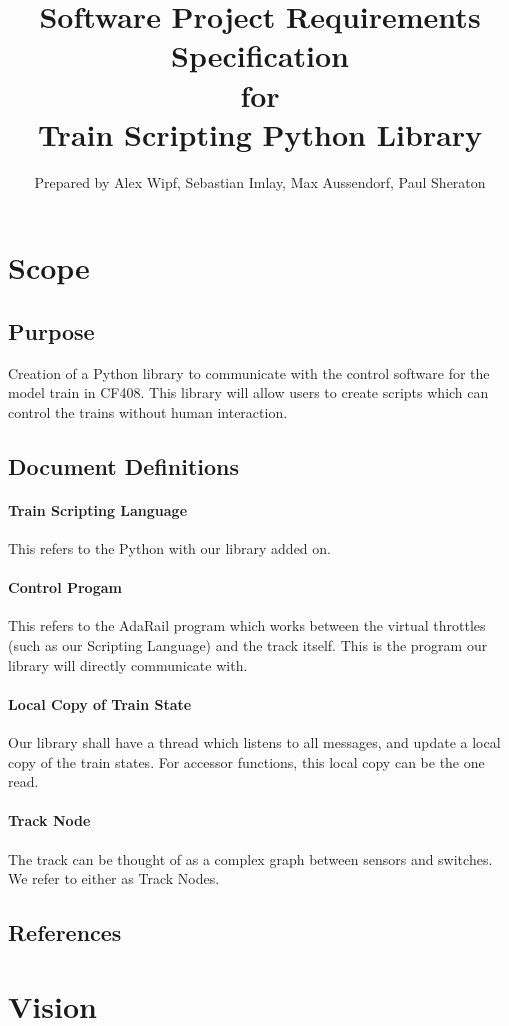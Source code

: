 \documentclass[a4paper,11pt,notitlepage]{article}
\title{{\bf Software Project Requirements Specification} \\ for \\ {\bf Train Scripting Python Library}}
\author{Prepared by Alex Wipf, Sebastian Imlay, Max Aussendorf, Paul Sheraton}
\def\TSL{Train Scripting Language\xspace}
\def\CS{Control Progam\xspace}
\def\LC{Local Copy of Train State\xspace}
\def\TN{Track Node\xspace}
\begin{document}
\maketitle
\pagebreak
\tableofcontents

\section{Scope}
\subsection{Purpose}
Creation of a Python library to communicate with the control software for the model train in CF408. This library will allow users to create scripts which can control the trains without human interaction.
\subsection{Document Definitions}
\paragraph{\TSL} This refers to the Python with our library added on.
\paragraph{\CS} This refers to the AdaRail program which works between the virtual throttles (such as our Scripting Language) and the track itself. This is the program our library will directly communicate with.
\paragraph{\LC} Our library shall have a thread which listens to all messages, and update a local copy of the train states. For accessor functions, this local copy can be the one read.
\paragraph{\TN} The track can be thought of as a complex graph between sensors and switches. We refer to either as \TN{}s.
\subsection{References}

\newpage
\section{Vision}
\end{document}
